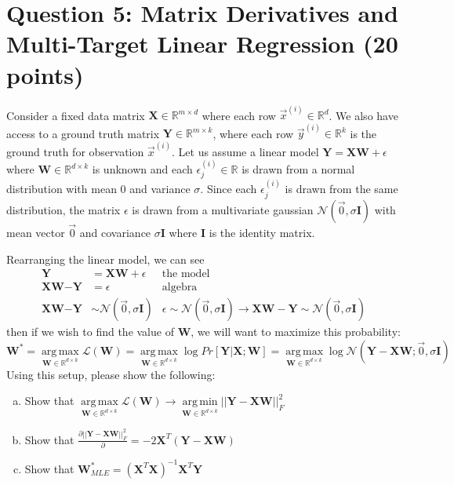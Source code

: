 \documentclass[11pt]{article}
\newcommand{\question}[1]{\section*{\normalsize #1}}
\DeclareMathOperator*{\argmax}{arg\,max}
\DeclareMathOperator*{\argmin}{arg\,min}
\begin{document}
\question{Question 5: Matrix Derivatives and Multi-Target Linear Regression (20 points)}
Consider a fixed data matrix $\textbf{X}\in \mathbb{R}^{m\times d}$ where each row $\vec{x}^{(i)}\in \mathbb{R}^{d}$. We also have access to a ground truth matrix $\textbf{Y}\in\mathbb{R}^{m\times k}$, where each row $\vec{y}^{(i)}\in\mathbb{R}^{k}$ is the ground truth for observation $\vec{x}^{(i)}$. Let us assume a linear model $\textbf{Y} = \textbf{X}\textbf{W} + \epsilon$ where $\textbf{W}\in \mathbb{R}^{d\times k}$ is unknown and each $\epsilon^{(i)}_j\in \mathbb{R}$ is drawn from a normal distribution with mean 0 and variance $\sigma$. Since each $\epsilon^{(i)}_j$ is drawn from the same distribution, the matrix $\epsilon$ is drawn from a multivariate gaussian $\mathcal{N}(\vec{0}, \sigma\textbf{I})$ with mean vector $\vec{0}$ and covariance $\sigma \textbf{I}$ where $\textbf{I}$ is the identity matrix.\newline

\noindent Rearranging the linear model, we can see
\begin{align*}
    \textbf{Y} &= \textbf{X}\textbf{W} + \epsilon   &\text{the model}\\
    \textbf{X}\textbf{W} - \textbf{Y} &= \epsilon   &\text{algebra}\\
    \textbf{X}\textbf{W} - \textbf{Y} &\sim \mathcal{N}(\vec{0}, \sigma\textbf{I}) &\epsilon\sim\mathcal{N}(\vec{0}, \sigma\textbf{I})\rightarrow  \textbf{X}\textbf{W} - \textbf{Y}\sim\mathcal{N}(\vec{0}, \sigma\textbf{I})
\end{align*}
then if we wish to find the value of $\textbf{W}$, we will want to maximize this probability:
$$\textbf{W}^* = \argmax\limits_{\textbf{W}\in \mathbb{R}^{d\times k}} \mathcal{L}(\textbf{W}) = \argmax\limits_{\textbf{W}\in \mathbb{R}^{d\times k}} \log Pr[\textbf{Y} | \textbf{X};\textbf{W}] = \argmax\limits_{\textbf{W}\in \mathbb{R}^{d\times k}} \log \mathcal{N}(\textbf{Y} - \textbf{X}\textbf{W} ; \vec{0}, \sigma\textbf{I})$$
Using this setup, please show the following:
\begin{enumerate}[(a)]
    \item Show that $\argmax\limits_{\textbf{W}\in \mathbb{R}^{d\times k}} \mathcal{L}(\textbf{W}) \rightarrow \argmin\limits_{\textbf{W}\in \mathbb{R}^{d\times k}} ||\textbf{Y} - \textbf{X}\textbf{W}||_F^2$

    \item Show that $\frac{\partial ||\textbf{Y} - \textbf{X}\textbf{W}||_F^2}{\partial } = -2\textbf{X}^T(\textbf{Y} - \textbf{X}\textbf{W})$

    \item Show that $\textbf{W}^*_{MLE} = (\textbf{X}^T\textbf{X})^{-1}\textbf{X}^T\textbf{Y}$
\end{enumerate}
\end{document}
